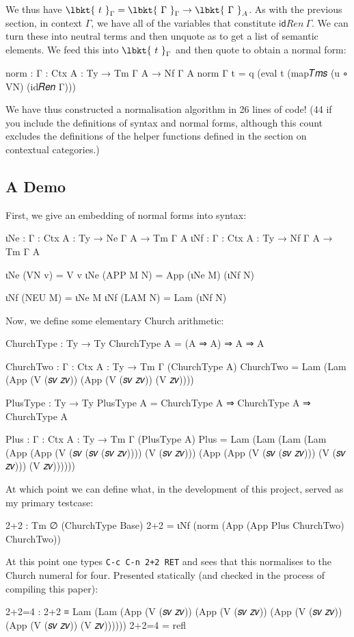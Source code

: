 We thus have $\lbkt{~t~}_\Gamma = \lbkt{~\Gamma~}_\Gamma \to \lbkt{~\Gamma~}_A$.
As with the previous section, in context $\Gamma$, we have all of the variables
that constitute $\mathsf{id}\mathit{Ren}~\Gamma$. We can turn these into
neutral terms and then unquote as to get a list of semantic elements. We feed
this into $\lbkt{~t~}_\Gamma$ and then quote to obtain a normal form:
\begin{code}
norm : {Γ : Ctx} {A : Ty} → Tm Γ A → Nf Γ A
norm {Γ} t = q (eval t (map𝑇𝑚𝑠 (u ∘ VN) (id𝑅𝑒𝑛 Γ)))
\end{code}
We have thus constructed a normalisation algorithm in 26 lines of code! (44 if
you include the definitions of syntax and normal forms, although this count
excludes the definitions of the helper functions defined in the section on
contextual categories.)

\subsection{A Demo}

First, we give an embedding of normal forms into syntax:
\begin{code}
ιNe : {Γ : Ctx} {A : Ty} → Ne Γ A → Tm Γ A
ιNf : {Γ : Ctx} {A : Ty} → Nf Γ A → Tm Γ A

ιNe (VN v) = V v
ιNe (APP M N) = App (ιNe M) (ιNf N)

ιNf (NEU M) = ιNe M
ιNf (LAM N) = Lam (ιNf N)
\end{code}
Now, we define some elementary Church arithmetic:
\begin{code}
ChurchType : Ty → Ty
ChurchType A = (A ⇒ A) ⇒ A ⇒ A

ChurchTwo : {Γ : Ctx} {A : Ty} → Tm Γ (ChurchType A)
ChurchTwo = Lam (Lam (App (V (𝑠𝑣 𝑧𝑣)) (App (V (𝑠𝑣 𝑧𝑣)) (V 𝑧𝑣))))

PlusType : Ty → Ty
PlusType A = ChurchType A ⇒ ChurchType A ⇒ ChurchType A

Plus : {Γ : Ctx} {A : Ty} → Tm Γ (PlusType A)
Plus = Lam (Lam (Lam (Lam (App (App (V (𝑠𝑣 (𝑠𝑣 (𝑠𝑣 𝑧𝑣)))) (V (𝑠𝑣 𝑧𝑣)))
                               (App (App (V (𝑠𝑣 (𝑠𝑣 𝑧𝑣))) (V (𝑠𝑣 𝑧𝑣))) (V 𝑧𝑣))))))
\end{code}
At which point we can define what, in the development of this project,
served as my primary testcase:
\begin{code}
2+2 : Tm ∅ (ChurchType Base)
2+2 = ιNf (norm (App (App Plus ChurchTwo) ChurchTwo))
\end{code}
At this point one types \texttt{C-c C-n 2+2 RET} and sees that this normalises
to the Church numeral for four. Presented statically (and checked in the process
of compiling this paper):
\begin{code}
2+2=4 : 2+2 ≡ Lam (Lam (App (V (𝑠𝑣 𝑧𝑣)) (App (V (𝑠𝑣 𝑧𝑣))
                  (App (V (𝑠𝑣 𝑧𝑣)) (App (V (𝑠𝑣 𝑧𝑣)) (V 𝑧𝑣))))))
2+2=4 = refl
\end{code}

